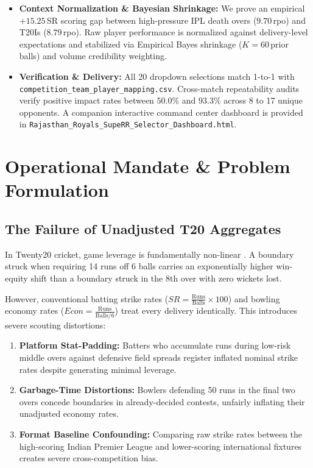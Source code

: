 \documentclass[11pt,a4paper]{article}
\begin{document}
\begin{itemize}[leftmargin=*,itemsep=4pt,topsep=2pt]
    \item \textbf{Context Normalization \& Bayesian Shrinkage:} We prove an empirical $+15.25$\,SR scoring gap between high-pressure IPL death overs ($9.70$\,rpo) and T20Is ($8.79$\,rpo). Raw player performance is normalized against delivery-level expectations and stabilized via Empirical Bayes shrinkage ($K = 60$\,prior balls) and volume credibility weighting.

    \item \textbf{Verification \& Delivery:} All 20 dropdown selections match 1-to-1 with \texttt{competition\_team\_player\_mapping.csv}. Cross-match repeatability audits verify positive impact rates between $50.0\%$ and $93.3\%$ across 8 to 17 unique opponents. A companion interactive command center dashboard is provided in \texttt{Rajasthan\_Royals\_SupeRR\_Selector\_Dashboard.html}.
\end{itemize}

\newpage

\section{Operational Mandate \& Problem Formulation}

\subsection{The Failure of Unadjusted T20 Aggregates}
In Twenty20 cricket, game leverage is fundamentally non-linear \cite{stern2016, beaudoin2010}. A boundary struck when requiring 14 runs off 6 balls carries an exponentially higher win-equity shift than a boundary struck in the 8th over with zero wickets lost. 

However, conventional batting strike rates ($SR = \frac{\text{Runs}}{\text{Balls}} \times 100$) and bowling economy rates ($Econ = \frac{\text{Runs}}{\text{Balls}/6}$) treat every delivery identically. This introduces severe scouting distortions:
\begin{enumerate}[leftmargin=*,itemsep=2pt]
    \item \textbf{Platform Stat-Padding:} Batters who accumulate runs during low-risk middle overs against defensive field spreads register inflated nominal strike rates despite generating minimal leverage.
    \item \textbf{Garbage-Time Distortions:} Bowlers defending 50 runs in the final two overs concede boundaries in already-decided contests, unfairly inflating their unadjusted economy rates.
    \item \textbf{Format Baseline Confounding:} Comparing raw strike rates between the high-scoring Indian Premier League and lower-scoring international fixtures creates severe cross-competition bias.
\end{enumerate}
\end{document}

